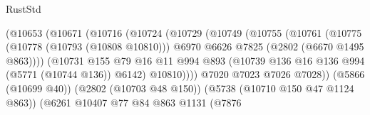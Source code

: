 \begin{lexlean}{RustStd}
\begin{coremodule}
                                        (@10653
                                          (@10671
                                            (@10716
                                              (@10724
                                                (@10729
                                                  (@10749
                                                    (@10755
                                                      (@10761
                                                        (@10775
                                                          (@10778 (@10793 (@10808 @10810)))
                                                          @6970
                                                          @6626
                                                          @7825
                                                          (@2802 (@6670 @1495 @863))))
                                                      (@10731
                                                        @155
                                                        @79
                                                        @16
                                                        @11
                                                        @994
                                                        @893
                                                        (@10739
                                                          @136
                                                          @16
                                                          @136
                                                          @994
                                                          (@5771 (@10744 @136))
                                                          @6142)
                                                        @10810))))
                                                @7020
                                                @7023
                                                @7026
                                                @7028))
                                            (@5866 (@10699 @40))
                                            (@2802 (@10703 @48 @150))
                                            (@5738 (@10710 @150 @47 @1124 @863))
                                            (@6261
                                              @10407
                                              @77
                                              @84
                                              @863
                                              @1131
                                              (@7876

\end{coremodule}
\end{lexlean}
